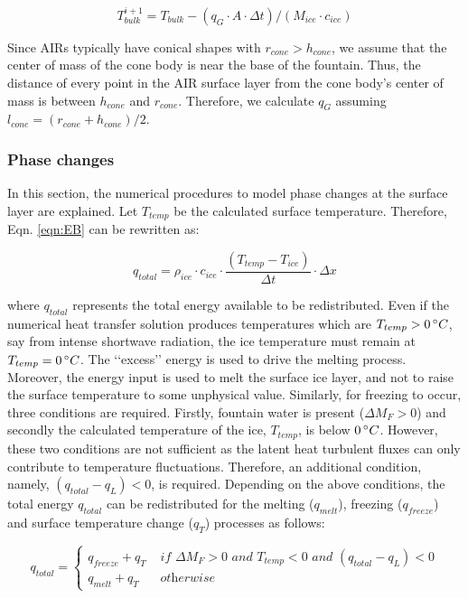 \documentclass[utf8]{frontiersSCNS}
\begin{document}
\begin{equation} T_{bulk}^{i+1} = T_{bulk} - (q_{G} \cdot A \cdot \Delta t)/(M_{ice} \cdot c_{ice}) \end{equation}

Since AIRs typically have conical shapes with $r_{cone} > h_{cone}$, we assume that the center of mass of the cone
body is near the base of the fountain. Thus, the distance of every point in the AIR surface layer from the cone
body's center of mass is between $h_{cone}$ and $r_{cone}$. Therefore, we calculate $q_{G}$ assuming $l_{cone} = (r_{cone} +
	h_{cone})/2$.

\subsubsection{Phase changes}

In this section, the numerical procedures to model phase changes at the surface layer are explained. Let
$T_{temp}$ be the calculated surface temperature. Therefore, Eqn. \ref{eqn:EB} can be rewritten as:

$$q_{total} =\rho_{ice} \cdot c_{ice} \cdot \frac{(T_{temp}-T_{ice})}{\Delta t} \cdot \Delta x$$

where $q_{total}$ represents the total energy available to be redistributed. Even if the numerical heat transfer
solution produces temperatures which are $T_{temp}>0\, \degree C$, say from intense shortwave radiation, the ice
temperature must remain at $T_{temp} = 0\, \degree C$. The ‘‘excess’’ energy is used to drive the melting
process. Moreover, the energy input is used to melt the surface ice layer, and not to raise the surface
temperature to some unphysical value. Similarly, for freezing to occur, three conditions are required. Firstly,
fountain water is present ($\Delta M_{F} > 0 $) and secondly the calculated temperature of the ice, $T_{temp}$,
is below $0\, \degree C$. However, these two conditions are not sufficient as the latent heat turbulent fluxes
can only contribute to temperature fluctuations. Therefore, an additional condition, namely, $(q_{total}-q_{L})
< 0$, is required. Depending on the above conditions, the total energy $q_{total}$ can be redistributed
for the melting ($q_{melt}$), freezing ($q_{freeze}$) and surface temperature change ($q_{T}$) processes as
follows:

\begin{equation}
	q_{total} = \left\{ \begin{array}{ll}
		q_{freeze} + q_{T} & \textit{ if } \Delta M_{F} > 0 \textit{ and } T_{temp} < 0 \textit{ and }(q_{total}-q_{L}) < 0 \\
		q_{melt} + q_{T}   & \textit{ otherwise}
	\end{array} \right.
\end{equation}
\end{document}
